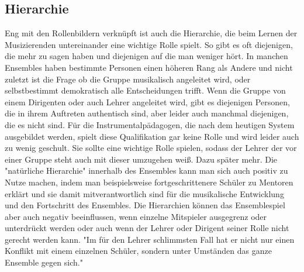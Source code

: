 \subsection{Hierarchie}
Eng mit den Rollenbildern verknüpft ist auch die Hierarchie, die beim Lernen der Musizierenden untereinander eine
wichtige Rolle spielt. So gibt es oft diejenigen, die mehr zu sagen haben und
diejenigen auf die man weniger hört. In manchen Ensembles haben bestimmte
Personen einen höheren Rang als Andere und nicht zuletzt ist die Frage ob die
Gruppe musikalisch angeleitet wird, oder selbstbestimmt demokratisch alle
Entscheidungen trifft. Wenn die Gruppe von einem Dirigenten oder auch Lehrer
angeleitet wird, gibt es diejenigen Personen, die in ihrem Auftreten authentisch
sind, aber leider auch manchmal diejenigen, die es nicht sind. Für die
Instrumentalpädagogen, die nach dem heutigen System ausgebildet werden, spielt
diese Qualifikation gar keine Rolle und wird leider auch zu wenig geschult. Sie sollte eine wichtige Rolle spielen, sodass der Lehrer der vor einer Gruppe
steht auch mit dieser umzugehen weiß. Dazu später mehr. Die "natürliche Hierarchie"
innerhalb des Ensembles kann man sich auch positiv zu Nutze machen, indem man beispielsweise
fortgeschrittenere Schüler zu Mentoren erklärt und sie
damit
mitverantwortlich sind 
für die musikalische Entwicklung und den Fortschritt des
Ensembles.\autocite[95]{doerne:umfassend_musizieren}
Die Hierarchien können das Ensemblespiel aber auch negativ beeinflussen, wenn
einzelne Mitspieler ausgegrenz oder unterdrückt werden oder auch wenn der Lehrer
oder Dirigent seiner Rolle nicht gerecht werden kann. "Im für den Lehrer
schlimmsten Fall hat er nicht nur einen Konflikt mit einem einzelnen Schüler,
sondern unter Umständen das ganze Ensemble gegen sich." \autocite[94]{mitzscherlich:musikpsychologie}


